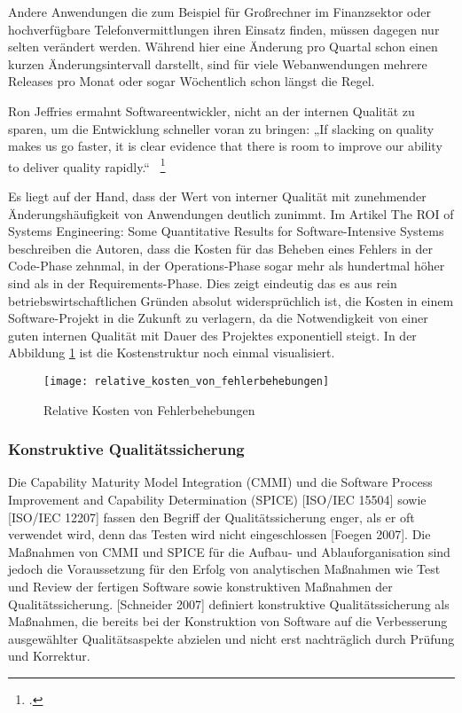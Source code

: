 Andere Anwendungen die zum Beispiel für Großrechner im Finanzsektor oder hochverfügbare Telefonvermittlungen ihren Einsatz finden, müssen dagegen nur selten verändert werden. Während hier eine Änderung pro Quartal schon einen kurzen Änderungsintervall darstellt, sind für viele Webanwendungen mehrere Releases pro Monat oder sogar Wöchentlich schon längst die Regel.

Ron Jeffries ermahnt Softwareentwickler, nicht an der internen Qualität zu sparen, um die Entwicklung schneller voran zu bringen:
„If slacking on quality makes us go faster, it is clear evidence that there is room to improve our ability to deliver quality rapidly.“ ~\footcite[Vgl.]{website:jeffries.2010}

Es liegt auf der Hand, dass der Wert von interner Qualität mit zunehmender Änderungshäufigkeit von Anwendungen deutlich zunimmt. Im Artikel \dq{}The ROI of Systems Engineering: Some Quantitative Results for
Software-Intensive Systems\dq{} beschreiben die Autoren, dass die Kosten für das Beheben eines Fehlers in der Code-Phase zehnmal, in der Operations-Phase sogar mehr als hundertmal höher sind als in der Requirements-Phase. 
Dies zeigt eindeutig das es aus rein betriebswirtschaftlichen Gründen absolut widersprüchlich ist, die Kosten in einem Software-Projekt in die Zukunft zu verlagern, da die Notwendigkeit von einer guten internen Qualität 
mit Dauer des Projektes exponentiell steigt. In der Abbildung \ref{relative_kosten_von_fehlerbehebungen} ist die Kostenstruktur noch einmal visualisiert.

\begin{figure}[H]
    \begin{center}
        \texttt{[image: relative\_kosten\_von\_fehlerbehebungen]}
        \caption{Relative Kosten von Fehlerbehebungen}
        \label{relative_kosten_von_fehlerbehebungen}
    \end{center}
\end{figure}


\subsubsection{Konstruktive Qualitätssicherung} %
Die Capability Maturity Model Integration (CMMI) und die Software Process Improvement and Capability Determination (SPICE) [ISO/IEC 15504] sowie [ISO/IEC 12207] fassen den Begriff der Qualitätssicherung enger, als er oft verwendet wird, denn das Testen wird nicht eingeschlossen [Foegen 2007]. Die Maßnahmen von CMMI und SPICE für die Aufbau- und Ablauforganisation sind jedoch die Voraussetzung für den Erfolg von analytischen Maßnahmen wie Test und Review der fertigen Software sowie konstruktiven Maßnahmen der Qualitätssicherung. [Schneider 2007] definiert konstruktive
Qualitätssicherung als Maßnahmen, die bereits bei der Konstruktion von Software auf die
Verbesserung ausgewählter Qualitätsaspekte abzielen und nicht erst nachträglich durch
Prüfung und Korrektur.

